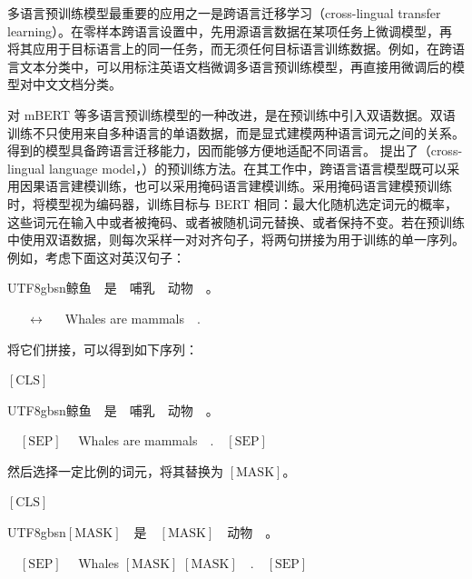 多语言预训练模型最重要的应用之一是跨语言迁移学习（cross-lingual transfer learning）。在零样本跨语言设置中，先用源语言数据在某项任务上微调模型，再将其应用于目标语言上的同一任务，而无须任何目标语言训练数据。例如，在跨语言文本分类中，可以用标注英语文档微调多语言预训练模型，再直接用微调后的模型对中文文档分类。

对 mBERT 等多语言预训练模型的一种改进，是在预训练中引入双语数据。双语训练不只使用来自多种语言的单语数据，而是显式建模两种语言词元之间的关系。得到的模型具备跨语言迁移能力，因而能够方便地适配不同语言。\citet{lample-conneau:2019cross} 提出了（cross-lingual language model，）的预训练方法。在其工作中，跨语言语言模型既可以采用因果语言建模训练，也可以采用掩码语言建模训练。采用掩码语言建模预训练时，将模型视为编码器，训练目标与 BERT 相同：最大化随机选定词元的概率，这些词元在输入中或者被掩码、或者被随机词元替换、或者保持不变。若在预训练中使用双语数据，则每次采样一对对齐句子，将两句拼接为用于训练的单一序列。例如，考虑下面这对英汉句子：

\vspace{0.5em}
\begin{center}
\begin{CJK*}{UTF8}{gbsn}鲸鱼\ \ 是\ \ 哺乳\ \ 动物\ \ 。\end{CJK*}\ \ \ $\leftrightarrow$\ \ \ Whales are mammals\ \ .
\end{center}
\vspace{0.5em}

\noindent 将它们拼接，可以得到如下序列：

\vspace{0.5em}
\begin{center}
$\mathrm{[CLS]}$ \begin{CJK*}{UTF8}{gbsn}鲸鱼\ \ 是\ \ 哺乳\ \ 动物\ \ 。\end{CJK*}\ \ $\mathrm{[SEP]}$ \ \ Whales are mammals\ \ .\ \ $\mathrm{[SEP]}$
\end{center}
\vspace{0.5em}

\noindent 然后选择一定比例的词元，将其替换为 $\mathrm{[MASK]}$。

\vspace{0.5em}
\begin{center}
$\mathrm{[CLS]}$ \begin{CJK*}{UTF8}{gbsn}$\mathrm{[MASK]}$\ \ 是\ \ $\mathrm{[MASK]}$\ \ 动物\ \ 。\end{CJK*}\ \ $\mathrm{[SEP]}$ \ \ Whales $\mathrm{[MASK]}$ $\mathrm{[MASK]}$\ \ .\ \ $\mathrm{[SEP]}$
\end{center}
\vspace{0.5em}

